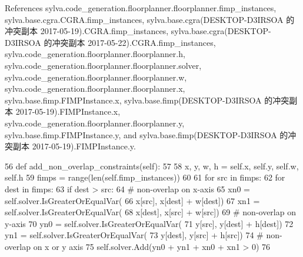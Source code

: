 References sylva.\+code\+\_\+generation.\+floorplanner.\+floorplanner.\+fimp\+\_\+instances, sylva.\+base.\+cgra.\+C\+G\+R\+A.\+fimp\+\_\+instances, sylva.\+base.\+cgra(\+D\+E\+S\+K\+T\+O\+P-\/\+D3\+I\+R\+S\+O\+A 的冲突副本 2017-\/05-\/19).\+C\+G\+R\+A.\+fimp\+\_\+instances, sylva.\+base.\+cgra(\+D\+E\+S\+K\+T\+O\+P-\/\+D3\+I\+R\+S\+O\+A 的冲突副本 2017-\/05-\/22).\+C\+G\+R\+A.\+fimp\+\_\+instances, sylva.\+code\+\_\+generation.\+floorplanner.\+floorplanner.\+h, sylva.\+code\+\_\+generation.\+floorplanner.\+floorplanner.\+solver, sylva.\+code\+\_\+generation.\+floorplanner.\+floorplanner.\+w, sylva.\+code\+\_\+generation.\+floorplanner.\+floorplanner.\+x, sylva.\+base.\+fimp.\+F\+I\+M\+P\+Instance.\+x, sylva.\+base.\+fimp(\+D\+E\+S\+K\+T\+O\+P-\/\+D3\+I\+R\+S\+O\+A 的冲突副本 2017-\/05-\/19).\+F\+I\+M\+P\+Instance.\+x, sylva.\+code\+\_\+generation.\+floorplanner.\+floorplanner.\+y, sylva.\+base.\+fimp.\+F\+I\+M\+P\+Instance.\+y, and sylva.\+base.\+fimp(\+D\+E\+S\+K\+T\+O\+P-\/\+D3\+I\+R\+S\+O\+A 的冲突副本 2017-\/05-\/19).\+F\+I\+M\+P\+Instance.\+y.


\begin{DoxyCode}
56     \textcolor{keyword}{def }add\_non\_overlap\_constraints(self):
57 
58         x, y, w, h = self.x, self.y, self.w, self.h
59         fimps = range(len(self.fimp\_instances))
60 
61         \textcolor{keywordflow}{for} src \textcolor{keywordflow}{in} fimps:
62             \textcolor{keywordflow}{for} dest \textcolor{keywordflow}{in} fimps:
63                 \textcolor{keywordflow}{if} dest > src:
64                     \textcolor{comment}{# non-overlap on x-axis}
65                     xn0 = self.solver.IsGreaterOrEqualVar(
66                         x[src], x[dest] + w[dest])
67                     xn1 = self.solver.IsGreaterOrEqualVar(
68                         x[dest], x[src] + w[src])
69                     \textcolor{comment}{# non-overlap on y-axis}
70                     yn0 = self.solver.IsGreaterOrEqualVar(
71                         y[src], y[dest] + h[dest])
72                     yn1 = self.solver.IsGreaterOrEqualVar(
73                         y[dest], y[src] + h[src])
74                     \textcolor{comment}{# non-overlap on x or y axis}
75                     self.solver.Add(yn0 + yn1 + xn0 + xn1 > 0)
76 
\end{DoxyCode}
\mbox{\label{classsylva_1_1code__generation_1_1floorplanner_1_1floorplanner_a34a19dab41b1f0c2eb39a527b05e26e0}} 
